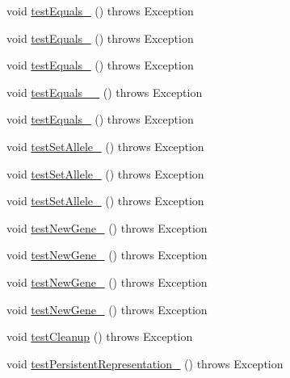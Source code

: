 \begin{DoxyCompactItemize}
\item 
void \hyperlink{classorg_1_1jgap_1_1impl_1_1_map_gene_test_aae4d425f59b5c2cfcdf5152e64e2eede}{test\-Equals\-\_} ()  throws Exception 
\item 
void \hyperlink{classorg_1_1jgap_1_1impl_1_1_map_gene_test_ab82b4fe64d2e6ff80720bebcec8a55f3}{test\-Equals\-\_} ()  throws Exception 
\item 
void \hyperlink{classorg_1_1jgap_1_1impl_1_1_map_gene_test_a9af5a0e70b47f070e275ff1c683502c1}{test\-Equals\-\_} ()  throws Exception 
\item 
void \hyperlink{classorg_1_1jgap_1_1impl_1_1_map_gene_test_a4b19204ba39c1fee3b904ab41ad39535}{test\-Equals\-\_\-\_} ()  throws Exception 
\item 
void \hyperlink{classorg_1_1jgap_1_1impl_1_1_map_gene_test_a3f351ee2e03d21b76ebf8b687d0f5abe}{test\-Equals\-\_} ()  throws Exception 
\item 
void \hyperlink{classorg_1_1jgap_1_1impl_1_1_map_gene_test_aa98a87c42a771b3c60c9d687ac19d2ba}{test\-Set\-Allele\-\_} ()  throws Exception 
\item 
void \hyperlink{classorg_1_1jgap_1_1impl_1_1_map_gene_test_ace56cc4234b94c60ba8db4619938a123}{test\-Set\-Allele\-\_} ()  throws Exception 
\item 
void \hyperlink{classorg_1_1jgap_1_1impl_1_1_map_gene_test_acd0d6bcb29fd2fee5ba0f8259618c9d2}{test\-Set\-Allele\-\_} ()  throws Exception 
\item 
void \hyperlink{classorg_1_1jgap_1_1impl_1_1_map_gene_test_a3367d5a2d86ba7f0d9467f30a7f3143b}{test\-New\-Gene\-\_} ()  throws Exception 
\item 
void \hyperlink{classorg_1_1jgap_1_1impl_1_1_map_gene_test_aa110813c5f2bdc9045aa2044eb2c7a70}{test\-New\-Gene\-\_} ()  throws Exception 
\item 
void \hyperlink{classorg_1_1jgap_1_1impl_1_1_map_gene_test_af16a147e8e62220d91afa1f0393c6e5a}{test\-New\-Gene\-\_} ()  throws Exception 
\item 
void \hyperlink{classorg_1_1jgap_1_1impl_1_1_map_gene_test_ab7deb8db5b683e0e902a3e9bf30bff7a}{test\-New\-Gene\-\_} ()  throws Exception 
\item 
void \hyperlink{classorg_1_1jgap_1_1impl_1_1_map_gene_test_a49ff30aa24423a7b73b2f0aff11b7541}{test\-Cleanup} ()  throws Exception 
\item 
void \hyperlink{classorg_1_1jgap_1_1impl_1_1_map_gene_test_a2d86a1bb4acbfca07c5d8137b79de781}{test\-Persistent\-Representation\-\_} ()  throws Exception 

\end{DoxyCompactItemize}
